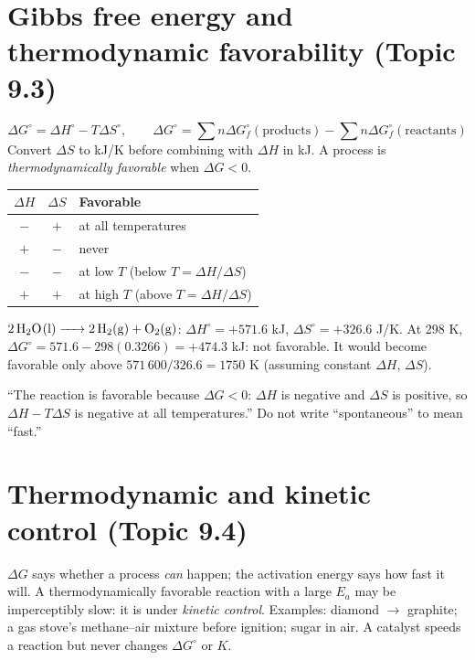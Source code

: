 \documentclass[11pt]{article}
\begin{document}
\section{Gibbs free energy and thermodynamic favorability (Topic 9.3)}\label{t:9.3}
\[ \Delta G^\circ = \Delta H^\circ - T\Delta S^\circ, \qquad \Delta G^\circ = \sum n\Delta G_f^\circ(\text{products}) - \sum n\Delta G_f^\circ(\text{reactants}) \]
Convert $\Delta S$ to kJ/K before combining with $\Delta H$ in kJ. A process is \emph{thermodynamically favorable} when $\Delta G < 0$.
\begin{center}
\begin{tabular}{ccl}\toprule
$\Delta H$ & $\Delta S$ & Favorable \\ \midrule
$-$ & $+$ & at all temperatures \\
$+$ & $-$ & never \\
$-$ & $-$ & at low $T$ (below $T = \Delta H/\Delta S$) \\
$+$ & $+$ & at high $T$ (above $T = \Delta H/\Delta S$) \\ \bottomrule
\end{tabular}
\end{center}
 $\ce{2H2O(l) -> 2H2(g) + O2(g)}$: $\Delta H^\circ = +571.6$ kJ, $\Delta S^\circ = +326.6$ J/K. At 298 K, $\Delta G^\circ = 571.6 - 298(0.3266) = +474.3$ kJ: not favorable. It would become favorable only above $571\,600/326.6 = 1750$ K (assuming constant $\Delta H$, $\Delta S$).

\frph ``The reaction is favorable because $\Delta G < 0$: $\Delta H$ is negative and $\Delta S$ is positive, so $\Delta H - T\Delta S$ is negative at all temperatures.'' Do not write ``spontaneous'' to mean ``fast.''

\section{Thermodynamic and kinetic control (Topic 9.4)}\label{t:9.4}
$\Delta G$ says whether a process \emph{can} happen; the activation energy says how fast it will. A thermodynamically favorable reaction with a large $E_a$ may be imperceptibly slow: it is under \emph{kinetic control}. Examples: diamond $\rightarrow$ graphite; a gas stove's methane--air mixture before ignition; sugar in air. A catalyst speeds a reaction but never changes $\Delta G^\circ$ or $K$.
\end{document}
